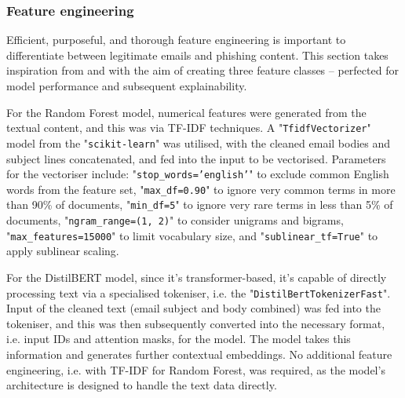 
\subsubsection*{Feature engineering}
Efficient, purposeful, and thorough feature engineering is important to differentiate between legitimate emails and phishing content. This section takes inspiration from \citep{do2024integrated} and \citep{hamid2013using} with the aim of creating three feature classes -- perfected for model performance and subsequent explainability.\newline

\noindent For the Random Forest model, numerical features were generated from the textual content, and this was via TF-IDF techniques. A "\texttt{TfidfVectorizer}" model from the "\texttt{scikit-learn}" was utilised, with the cleaned email bodies and subject lines concatenated, and fed into the input to be vectorised. Parameters for the vectoriser include: "\texttt{stop\_words='english'}" to exclude common English words from the feature set, "\texttt{max\_df=0.90}" to ignore very common terms in more than 90\% of documents, "\texttt{min\_df=5}" to ignore very rare terms in less than 5\% of documents, "\texttt{ngram\_range=(1, 2)}" to consider unigrams and bigrams, "\texttt{max\_features=15000}" to limit vocabulary size, and "\texttt{sublinear\_tf=True}" to apply sublinear scaling.\newline

\noindent For the DistilBERT model, since it's transformer-based, it's capable of directly processing text via a specialised tokeniser, i.e. the "\texttt{DistilBertTokenizerFast}". Input of the cleaned text (email subject and body combined) was fed into the tokeniser, and this was then subsequently converted into the necessary format, i.e. input IDs and attention masks, for the model. The model takes this information and generates further contextual embeddings. No additional feature engineering, i.e. with TF-IDF for Random Forest, was required, as the model's architecture is designed to handle the text data directly.

